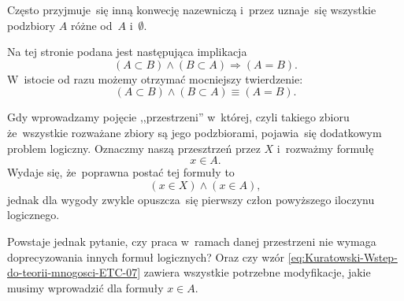 \documentclass[a4paper,11pt]{article}
\begin{document}
 Często przyjmuje~się inną konwecję nazewniczą i~przez  uznaje~się wszystkie podzbiory $A$ różne od~$A$ i~$\emptyset$.

\vspace{\spaceFour}





 Na tej stronie podana jest następująca implikacja
\begin{equation}
  \label{eq:Kuratowski-Wstep-do-teorii-mnogosci-ETC-05}
  ( A \subset B ) \land ( B \subset A ) \Rightarrow ( A = B ).
\end{equation}
W~istocie od razu możemy otrzymać mocniejszy twierdzenie:
\begin{equation}
  \label{eq:Kuratowski-Wstep-do-teorii-mnogosci-ETC-06}
  ( A \subset B ) \land ( B \subset A ) \equiv ( A = B ).
\end{equation}

\vspace{\spaceFour}





 Gdy wprowadzamy pojęcie ,,przestrzeni'' w~której, czyli takiego zbioru
że~wszystkie rozważane zbiory są jego podzbiorami, pojawia~się dodatkowym problem logiczny.
Oznaczmy naszą przesztrzeń przez $X$ i~rozważmy formułę
\begin{equation}
  \label{eq:Kuratowski-Wstep-do-teorii-mnogosci-ETC-06}
  x \in A.
\end{equation}
Wydaje się, że~poprawna postać tej formuły to
\begin{equation}
  \label{eq:Kuratowski-Wstep-do-teorii-mnogosci-ETC-07}
  ( x \in X ) \land ( x \in A ),
\end{equation}
jednak dla wygody zwykle opuszcza~się pierwszy człon powyższego iloczynu logicznego.

Powstaje jednak pytanie, czy praca w~ramach danej przestrzeni nie wymaga doprecyzowania
innych formuł logicznych? Oraz czy wzór \eqref{eq:Kuratowski-Wstep-do-teorii-mnogosci-ETC-07}
zawiera wszystkie potrzebne modyfikacje, jakie musimy wprowadzić dla formuły $x \in A$.

\vspace{\spaceFour}
\end{document}
